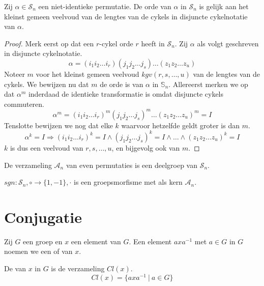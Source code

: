 \documentclass[main.tex]{subfiles}
\begin{document}
\begin{st}
  Zij $\alpha \in \mathcal{S}_{n}$ een niet-identieke permutatie.
  De orde van $\alpha$ in $\mathcal{S}_{n}$ is gelijk aan het kleinst gemeen veelvoud van de lengtes van de cykels in disjuncte cykelnotatie van $\alpha$.

  \begin{proof}
    Merk eerst op dat een $r$-cykel orde $r$ heeft in $\mathcal{S}_{n}$.\waarom
    Zij $\alpha$ als volgt geschreven in disjuncte cykelnotatie.
    \[ \alpha = (i_{1}i_{2}\dotsc i_{r})(j_{1}j_{2}\dotsc j_{s})\dotsc(z_{1}z_{2}\dotsc z_{u}) \]
    Noteer $m$ voor het kleinst gemeen veelvoud $kgv(r,s,\dotsc,u)$ van de lengtes van de cykels.
    We bewijzen nu dat $m$ de orde is van $\alpha$ in $\mathbb{S}_{n}$.
    Allereerst merken we op dat $\alpha^{m}$ inderdaad de identieke transformatie is omdat disjuncte cykels commuteren.
    \[ \alpha^{m} = (i_{1}i_{2}\dotsc i_{r})^{m}(j_{1}j_{2}\dotsc j_{s})^{m}\dotsc(z_{1}z_{2}\dotsc z_{u})^{m} = I \]
    Tenslotte bewijzen we nog dat elke $k$ waarvoor hetzelfde geldt groter is dan $m$.
    \[ \alpha^{k} = I \Rightarrow (i_{1}i_{2}\dotsc i_{r})^{k} = I \wedge (j_{1}j_{2}\dotsc j_{s})^{k} = I \wedge \dotsc \wedge (z_{1}z_{2}\dotsc z_{u})^{k} = I \]
    $k$ is dus een veelvoud van $r,s,\dotsc,u$, en bijgevolg ook van $m$.
  \end{proof}
\end{st}

\begin{st}
  De verzameling $\mathcal{A}_{n}$ van even permutaties is een deelgroep van $\mathcal{S}_{n}$.
\end{st}

\begin{st}
  $sgn: \mathcal{S}_{n},\circ \rightarrow \{1,-1\},\cdot$ is een groepsmorfisme met als kern $\mathcal{A}_{n}$.
\end{st}

\section{Conjugatie}
\label{sec:conjugatie}

\begin{de}
  Zij $G$ een groep en $x$ een element van $G$.
  Een element $axa^{-1}$ met $a\in G$ in $G$ noemen we een  of  van $x$.
\end{de}

\begin{de}
  De  van $x$ in $G$ is de verzameling $Cl(x)$.
  \[ Cl(x) = \{ axa^{-1}\ |\ a \in G \} \]
\end{de}
\end{document}
